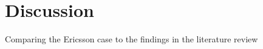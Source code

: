 
\chapter{Discussion}
\label{chapter:discussion}


Comparing the Ericsson case to the findings in the literature review

